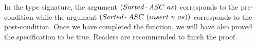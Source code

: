 \par In the type signature, the argument \((Sorted\operatorname{-} ASC\ as)\) corresponds to
the pre-condition while the argument 
\((Sorted\operatorname{-} ASC\ (insert\ n\ as))\) corresponds to the
post-condition. Once we have completed the
function, we will have also proved the specification to be
true. Readers are recommended to finish the proof. 